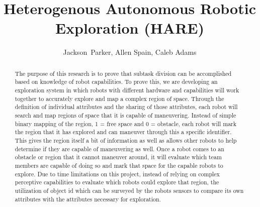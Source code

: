 \documentclass[conference]{IEEEtran}
\begin{document}
\title{Heterogenous Autonomous Robotic Exploration (HARE)}

\author{Jackson~Parker, Allen Spain, Caleb Adams}












\maketitle

\begin{abstract}
  The purpose of this research is to prove that subtask division can be accomplished based on knowledge of robot capabilities. To prove this, we are developing an exploration system in which robots with different hardware and capabilities will work together to accurately explore and map a complex region of space. Through the definition of individual attributes and the sharing of those attributes, each robot will search and map regions of space that it is capable of maneuvering. Instead of simple binary mapping of the region, 1 = free space and 0 = obstacle, each robot will mark the region that it has explored and can maneuver through this a specific identifier. This gives the region itself a bit of information as well as allows other robots to help determine if they are capable of maneuvering as well.
  Once a robot comes to an obstacle or region that it cannot maneuver around, it will evaluate which team members are capable of doing so and mark that space for the capable robots to explore. Due to time limitations on this project, instead of relying on complex perceptive capabilities to evaluate which robots could explore that region, the utilization of object id which can be surveyed by the robots sensors to compare its own attributes with the attributes necessary for exploration.
\end{abstract}
\end{document}
